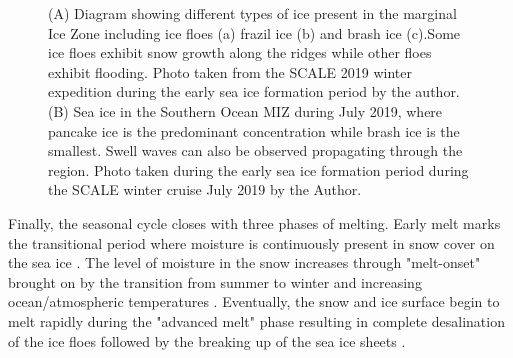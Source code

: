 \begin{figure}[H]
	\centering
	\begin{subfigure}[t]{0.5\textwidth}

	\label{fig:Ice Types}
	\end{subfigure}%
	\begin{subfigure}[t]{0.5\textwidth}
		\label{fig:MIZICE}
	\end{subfigure}%
	\caption{(A) Diagram showing different types of ice present in the marginal Ice Zone including ice floes (a) frazil ice (b) and brash ice (c).Some ice floes exhibit snow growth along the ridges while other floes exhibit flooding. Photo taken from the SCALE 2019 winter expedition during the early sea ice formation period by the author. (B) Sea ice in the Southern Ocean MIZ during July 2019, where pancake ice is the predominant  concentration while brash ice is the smallest. Swell waves can also be observed propagating through the region. Photo taken during the early sea ice formation period during the SCALE winter cruise July 2019 by the Author.}
	\label{fig:ridging}
\end{figure}


Finally, the seasonal cycle closes with three phases of melting. Early melt marks the transitional period  where moisture is continuously present in snow cover on the sea ice \cite{barber2005microwave}. The level of moisture in the snow increases through "melt-onset" brought on by the transition from summer to winter and increasing ocean/atmospheric temperatures \cite{barber2005microwave}. Eventually, the snow and ice surface begin to melt rapidly during the "advanced melt" phase resulting in complete desalination of the ice floes followed by the breaking up of the sea ice sheets \cite{barber2005microwave}. 

